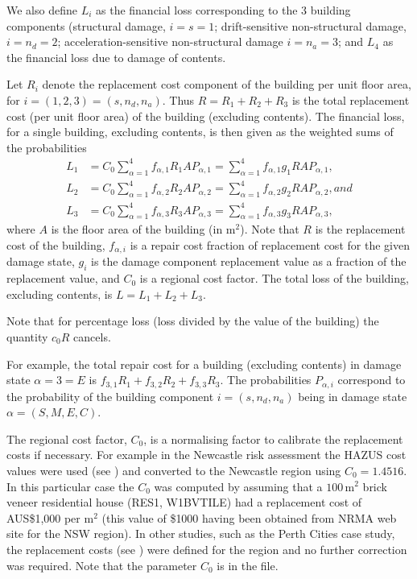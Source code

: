 We also define $L_i$ as the financial loss corresponding to the 3
building components (structural damage, $i=s=1$; drift-sensitive
non-structural damage, $i=n_d=2$; acceleration-sensitive
non-structural damage $i=n_a=3$; and $L_4$ as the financial loss
due to damage of contents.


Let $R_i$ denote the replacement cost component of the building
per unit floor area, for $i=(1,2,3)=(s,n_d,n_a)$. Thus
$R=R_1+R_2+R_3$ is the total replacement cost (per unit floor
area) of the building (excluding contents). The financial loss,
for a single building, excluding contents, is then given as the
weighted sums of the probabilities
\begin{align*}
\label{eq:this-loss}
 L_1 &= C_0\sum_{\alpha=1}^4
   f_{\alpha, 1} R_1 A P_{\alpha, 1} =
   \sum_{\alpha=1}^4 f_{\alpha, 1} g_1R A P_{\alpha, 1},\\
L_2 &= C_0 \sum_{\alpha=1}^4
   f_{\alpha, 2} R_2 A P_{\alpha, 2} =
   \sum_{\alpha=1}^4 f_{\alpha, 2} g_2R A P_{\alpha, 2}, and\\
L_3 &= C_0 \sum_{\alpha=1}^4
   f_{\alpha, 3} R_3 A P_{\alpha, 3} =
    \sum_{\alpha=1}^4 f_{\alpha, 3} g_3R A P_{\alpha, 3},
\end{align*}
where $A$ is the floor area of the building (in $\mathrm{m}^2$).
Note that $R$ is the replacement cost of the building, $f_{\alpha,
i}$ is a repair cost fraction of replacement cost for the given
damage state, $g_i$ is the damage component replacement value as a
fraction of the replacement value, and $C_0$ is a regional cost
factor. The total loss of the
building, excluding contents, is $L=L_1+L_2+L_3$.

Note that for percentage loss (loss divided by the value of the
building) the quantity $c_0R$ cancels.


For example, the total repair cost for a building (excluding contents)
in damage
state $\alpha=3=E$ is $f_{3,1}R_1+f_{3,2}R_2+f_{3,3}R_3$.
The probabilities $P_{\alpha, i}$ correspond to the probability
of the building component $i=(s, n_d, n_a)$ being in damage state
$\alpha=(S,M,E,C)$.

The regional cost factor, $C_0$, is a
normalising factor to calibrate the replacement costs if
necessary. For example in the Newcastle risk assessment
\citep{dr_Fulford02a} the HAZUS cost values were used (see
) and converted to the Newcastle region
using $C_0= 1.4516$. In this particular case the $C_0$ was
computed by assuming that a $100\,\mathrm{m^2}$ brick veneer
residential house (RES1, W1BVTILE) had a replacement cost of
AUS\$1,000 per $\mathrm{m}^2$ (this value of \$1000 having been
obtained from NRMA web site for the NSW region). In other studies,
such as the Perth Cities case study, the replacement costs (see
) were defined for the region and
no further correction was required. Note that the parameter $C_0$
is  in the  file.

